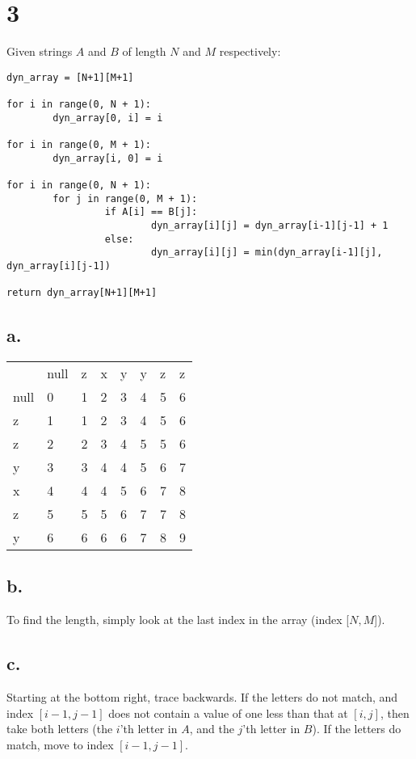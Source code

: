 \documentclass[letterpaper,notitlepage,twoside]{article}
\begin{document}
\section*{3}
Given strings $A$ and $B$ of length $N$ and $M$ respectively:
\begin{verbatim}
dyn_array = [N+1][M+1]

for i in range(0, N + 1):	
        dyn_array[0, i] = i

for i in range(0, M + 1):	
        dyn_array[i, 0] = i

for i in range(0, N + 1):
        for j in range(0, M + 1):
                 if A[i] == B[j]:
                         dyn_array[i][j] = dyn_array[i-1][j-1] + 1
                 else:
                         dyn_array[i][j] = min(dyn_array[i-1][j], dyn_array[i][j-1])

return dyn_array[N+1][M+1]
\end{verbatim}
\subsection*{a.}

\begin{tabular}{llllllll}
     & null & z & x & y & y & z & z \\
null & 0    & 1 & 2 & 3 & 4 & 5 & 6 \\
z    & 1    & 1 & 2 & 3 & 4 & 5 & 6 \\
z    & 2    & 2 & 3 & 4 & 5 & 5 & 6 \\
y    & 3    & 3 & 4 & 4 & 5 & 6 & 7 \\
x    & 4    & 4 & 4 & 5 & 6 & 7 & 8 \\
z    & 5    & 5 & 5 & 6 & 7 & 7 & 8 \\
y    & 6    & 6 & 6 & 6 & 7 & 8 & 9 \\
\end{tabular}

\subsection*{b.}
To find the length, simply look at the last index in the array (index [$N,M$]).  
\subsection*{c.}
Starting at the bottom right, trace backwards. If the letters do not match, and index $[i-1, j-1]$ does not contain a value of one less than that at $[i, j]$, then take both letters (the $i$'th letter in $A$, and the $j$'th letter in $B$). If the letters do match, move to index $[i-1, j-1]$. 
\end{document}
